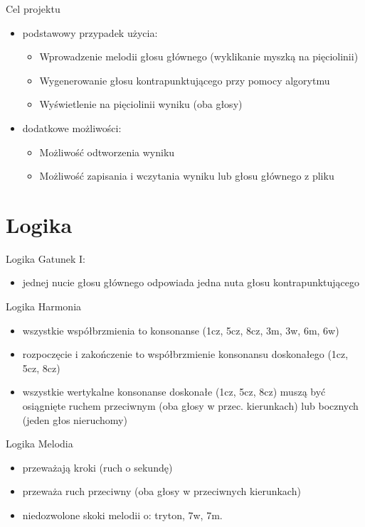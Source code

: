 \documentclass{beamer}
\begin{document}
\begin{frame}{Cel projektu}
	\begin{itemize}
		\item podstawowy przypadek użycia:
			\begin{itemize}
				\item Wprowadzenie melodii głosu głównego (wyklikanie myszką na pięciolinii)
				\item Wygenerowanie głosu kontrapunktującego przy pomocy algorytmu
				\item Wyświetlenie na pięciolinii wyniku (oba głosy)
			\end{itemize}
		\item dodatkowe możliwości:
			\begin{itemize}
				\item Możliwość odtworzenia wyniku
				\item Możliwość zapisania i wczytania wyniku lub głosu głównego z pliku
			\end{itemize}
	\end{itemize}
\end{frame}

\section{Logika}
\begin{frame}{Logika}
	Gatunek I:
	\begin{itemize}
		\item jednej nucie głosu głównego odpowiada jedna nuta głosu kontrapunktującego
 
	\end{itemize}
\end{frame}

\begin{frame}{Logika}
	Harmonia
	\begin{itemize}
		\item wszystkie współbrzmienia to konsonanse (1cz, 5cz, 8cz, 3m, 3w, 6m, 6w)
		\item rozpoczęcie i zakończenie to współbrzmienie konsonansu doskonałego (1cz, 5cz, 8cz)
		\item wszystkie wertykalne konsonanse doskonałe (1cz, 5cz, 8cz) muszą być osiągnięte ruchem 
		przeciwnym (oba głosy w przec. kierunkach) lub bocznych (jeden głos nieruchomy)
	\end{itemize}
\end{frame}

\begin{frame}{Logika}
	Melodia
	\begin{itemize}
		\item przeważają kroki (ruch o sekundę)
		\item przeważa ruch przeciwny (oba głosy w przeciwnych kierunkach)
		\item niedozwolone skoki melodii o: tryton, 7w, 7m.
	\end{itemize}
\end{frame}
\end{document}
